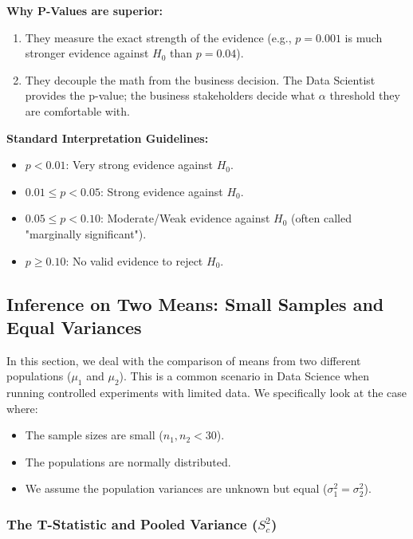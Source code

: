 \pagebreak

\textbf{Why P-Values are superior:}
\begin{enumerate}
    \item They measure the exact strength of the evidence (e.g., $p = 0.001$ is much stronger evidence against $H_0$ than $p = 0.04$).
    \item They decouple the math from the business decision. The Data Scientist provides the p-value; the business stakeholders decide what $\alpha$ threshold they are comfortable with.
\end{enumerate}

\textbf{Standard Interpretation Guidelines:}
\begin{itemize}
    \item $p < 0.01$: Very strong evidence against $H_0$.
    \item $0.01 \leq p < 0.05$: Strong evidence against $H_0$.
    \item $0.05 \leq p < 0.10$: Moderate/Weak evidence against $H_0$ (often called "marginally significant").
    \item $p \geq 0.10$: No valid evidence to reject $H_0$.
\end{itemize}

\subsection{Inference on Two Means: Small Samples and Equal Variances}

In this section, we deal with the comparison of means from two different populations ($\mu_1$ and $\mu_2$). This is a common scenario in Data Science when running controlled experiments with limited data. We specifically look at the case where:
\begin{itemize}
    \item The sample sizes are small ($n_1, n_2 < 30$).
    \item The populations are normally distributed.
    \item We assume the population variances are unknown but equal ($\sigma_1^2 = \sigma_2^2$).
\end{itemize}

\subsubsection{The T-Statistic and Pooled Variance ($S_c^2$)}


